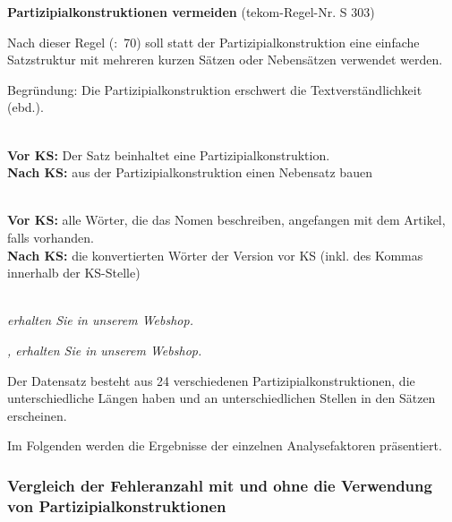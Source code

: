 \begin{description}[font=\normalfont\bfseries]
\item [Beschreibung der KS-Regel:] \textbf{Partizipialkonstruktionen vermeiden} (tekom-Regel-Nr. S 303)

Nach dieser Regel (\citealt{tekom2013}:~70) soll statt der Partizipialkonstruktion eine einfache Satzstruktur mit mehreren kurzen Sätzen oder Nebensätzen verwendet werden.

Begründung: Die Partizipialkonstruktion erschwert die Textverständlichkeit (ebd.).

\item[Umsetzungsmuster:]
~\\
\textbf{Vor KS:} Der Satz beinhaltet eine Partizipialkonstruktion.\\
\textbf{Nach KS:} aus der Partizipialkonstruktion einen Nebensatz bauen

\item[KS-Stelle]
~\\
\textbf{Vor KS:} alle Wörter, die das Nomen beschreiben, angefangen mit dem Artikel, falls vorhanden.\\
\textbf{Nach KS:} die konvertierten Wörter der Version vor KS (inkl. des Kommas innerhalb der KS-Stelle)

\item[Beispiele]
~\\
\textit{ erhalten Sie in unserem Webshop.}

\textit{, erhalten Sie in unserem Webshop.}

\item[Aufteilung der Testsätze:]
Der Datensatz besteht aus 24 verschiedenen Partizipialkonstruktionen, die unterschiedliche Längen haben und an unterschiedlichen Stellen in den Sätzen erscheinen.

\end{description}


Im Folgenden werden die Ergebnisse der einzelnen Analysefaktoren präsentiert.

\subsubsection{Vergleich der Fehleranzahl mit und ohne die Verwendung von Partizipialkonstruktionen}
\label{sec:5.3.5.1}

